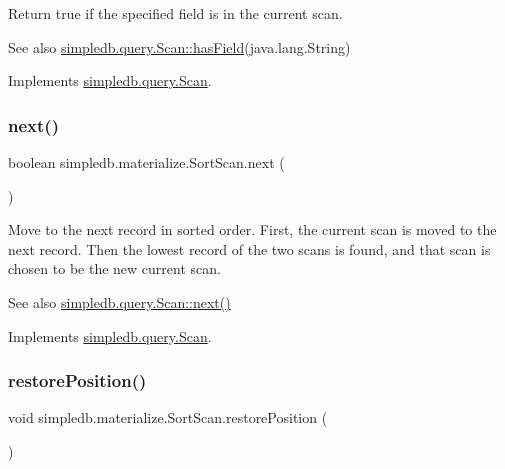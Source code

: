 Return true if the specified field is in the current scan. \begin{DoxySeeAlso}{See also}
\hyperlink{interfacesimpledb_1_1query_1_1Scan_a8f4ccf13eed0bed983c928e9b998fe5c}{simpledb.\+query.\+Scan\+::has\+Field}(java.\+lang.\+String) 
\end{DoxySeeAlso}


Implements \hyperlink{interfacesimpledb_1_1query_1_1Scan_a8f4ccf13eed0bed983c928e9b998fe5c}{simpledb.\+query.\+Scan}.

\mbox{\label{classsimpledb_1_1materialize_1_1SortScan_a4180abc890522265c22728e67f2131cd}} 
\subsubsection{\texorpdfstring{next()}{next()}}
{\footnotesize\ttfamily boolean simpledb.\+materialize.\+Sort\+Scan.\+next (\begin{DoxyParamCaption}{ }\end{DoxyParamCaption})\hspace{0.3cm}{\ttfamily [inline]}}

Move to the next record in sorted order. First, the current scan is moved to the next record. Then the lowest record of the two scans is found, and that scan is chosen to be the new current scan. \begin{DoxySeeAlso}{See also}
\hyperlink{interfacesimpledb_1_1query_1_1Scan_a5fc77b7c76d91f89f6c09ac4f15ef351}{simpledb.\+query.\+Scan\+::next()} 
\end{DoxySeeAlso}


Implements \hyperlink{interfacesimpledb_1_1query_1_1Scan_a5fc77b7c76d91f89f6c09ac4f15ef351}{simpledb.\+query.\+Scan}.

\mbox{\label{classsimpledb_1_1materialize_1_1SortScan_a11a8c64ec0c360d31469606780481625}} 
\subsubsection{\texorpdfstring{restore\+Position()}{restorePosition()}}
{\footnotesize\ttfamily void simpledb.\+materialize.\+Sort\+Scan.\+restore\+Position (\begin{DoxyParamCaption}{ }\end{DoxyParamCaption})\hspace{0.3cm}{\ttfamily [inline]}}

